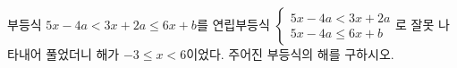 부등식 $5x-4a<3x+2a\le 6x+b$를 연립부등식 $\begin{cases} 5x-4a<3x+2a \\ 5x-4a\le 6x+b \end{cases}$로 잘못 나타내어 풀었더니 해가 $-3\le x<6$이었다. 주어진 부등식의 해를 구하시오. 

